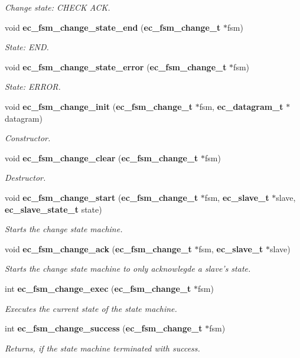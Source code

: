 \begin{DoxyCompactItemize}
\begin{DoxyCompactList}\small\item\em \-Change state\-: \-C\-H\-E\-C\-K \-A\-C\-K. \end{DoxyCompactList}\item 
void {\bf ec\-\_\-fsm\-\_\-change\-\_\-state\-\_\-end} ({\bf ec\-\_\-fsm\-\_\-change\-\_\-t} $\ast$fsm)
\begin{DoxyCompactList}\small\item\em \-State\-: \-E\-N\-D. \end{DoxyCompactList}\item 
void {\bf ec\-\_\-fsm\-\_\-change\-\_\-state\-\_\-error} ({\bf ec\-\_\-fsm\-\_\-change\-\_\-t} $\ast$fsm)
\begin{DoxyCompactList}\small\item\em \-State\-: \-E\-R\-R\-O\-R. \end{DoxyCompactList}\item 
void {\bf ec\-\_\-fsm\-\_\-change\-\_\-init} ({\bf ec\-\_\-fsm\-\_\-change\-\_\-t} $\ast$fsm, {\bf ec\-\_\-datagram\-\_\-t} $\ast$datagram)
\begin{DoxyCompactList}\small\item\em \-Constructor. \end{DoxyCompactList}\item 
void {\bf ec\-\_\-fsm\-\_\-change\-\_\-clear} ({\bf ec\-\_\-fsm\-\_\-change\-\_\-t} $\ast$fsm)
\begin{DoxyCompactList}\small\item\em \-Destructor. \end{DoxyCompactList}\item 
void {\bf ec\-\_\-fsm\-\_\-change\-\_\-start} ({\bf ec\-\_\-fsm\-\_\-change\-\_\-t} $\ast$fsm, {\bf ec\-\_\-slave\-\_\-t} $\ast$slave, {\bf ec\-\_\-slave\-\_\-state\-\_\-t} state)
\begin{DoxyCompactList}\small\item\em \-Starts the change state machine. \end{DoxyCompactList}\item 
void {\bf ec\-\_\-fsm\-\_\-change\-\_\-ack} ({\bf ec\-\_\-fsm\-\_\-change\-\_\-t} $\ast$fsm, {\bf ec\-\_\-slave\-\_\-t} $\ast$slave)
\begin{DoxyCompactList}\small\item\em \-Starts the change state machine to only acknowlegde a slave's state. \end{DoxyCompactList}\item 
int {\bf ec\-\_\-fsm\-\_\-change\-\_\-exec} ({\bf ec\-\_\-fsm\-\_\-change\-\_\-t} $\ast$fsm)
\begin{DoxyCompactList}\small\item\em \-Executes the current state of the state machine. \end{DoxyCompactList}\item 
int {\bf ec\-\_\-fsm\-\_\-change\-\_\-success} ({\bf ec\-\_\-fsm\-\_\-change\-\_\-t} $\ast$fsm)
\begin{DoxyCompactList}\small\item\em \-Returns, if the state machine terminated with success. \end{DoxyCompactList}\end{DoxyCompactItemize}
